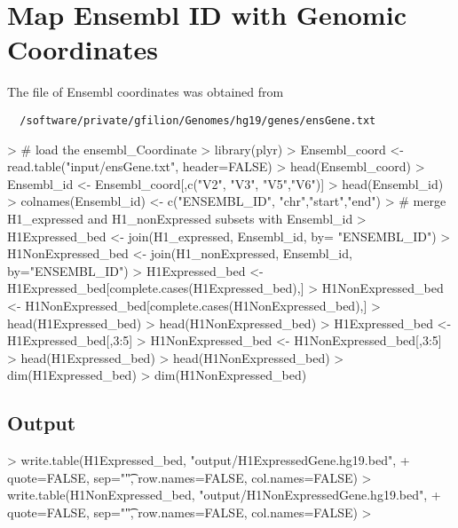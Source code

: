 \documentclass{article}
\begin{document}
\section{Map Ensembl ID with Genomic Coordinates}
The file of Ensembl coordinates was obtained from
\begin{verbatim}
  /software/private/gfilion/Genomes/hg19/genes/ensGene.txt
\end{verbatim}
\begin{Schunk}
\begin{Sinput}
> # load the ensembl_Coordinate
> library(plyr)
> Ensembl_coord <- read.table("input/ensGene.txt", header=FALSE)
> head(Ensembl_coord)
> Ensembl_id <- Ensembl_coord[,c("V2", "V3", "V5","V6")]
> head(Ensembl_id)
> colnames(Ensembl_id) <- c("ENSEMBL_ID", "chr","start","end")
> # merge H1_expressed and H1_nonExpressed subsets with Ensembl_id
> H1Expressed_bed <- join(H1_expressed, Ensembl_id, by= "ENSEMBL_ID")
> H1NonExpressed_bed <- join(H1_nonExpressed, Ensembl_id, by="ENSEMBL_ID")
> H1Expressed_bed <- H1Expressed_bed[complete.cases(H1Expressed_bed),]
> H1NonExpressed_bed <- H1NonExpressed_bed[complete.cases(H1NonExpressed_bed),]
> head(H1Expressed_bed)
> head(H1NonExpressed_bed)
> H1Expressed_bed <- H1Expressed_bed[,3:5]
> H1NonExpressed_bed <- H1NonExpressed_bed[,3:5]
> head(H1Expressed_bed)
> head(H1NonExpressed_bed)
> dim(H1Expressed_bed)
> dim(H1NonExpressed_bed)
\end{Sinput}
\end{Schunk}

\subsection{Output}
\begin{Schunk}
\begin{Sinput}
> write.table(H1Expressed_bed, "output/H1ExpressedGene.hg19.bed", 
+             quote=FALSE, sep="\t", row.names=FALSE, col.names=FALSE)
> write.table(H1NonExpressed_bed, "output/H1NonExpressedGene.hg19.bed",
+             quote=FALSE, sep="\t", row.names=FALSE, col.names=FALSE)
> 
\end{Sinput}
\end{Schunk}
\end{document}
